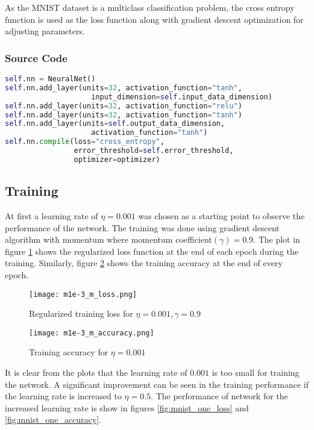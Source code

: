 \documentclass{article}
\begin{document}
As the MNIST dataset is a multiclass classification problem, the cross entropy function
is used as the loss function along with gradient descent optimization for adjusting
parameters.

\subsubsection{Source Code}
\begin{lstlisting}[language=python]
self.nn = NeuralNet()
self.nn.add_layer(units=32, activation_function="tanh",
                    input_dimension=self.input_data_dimension)
self.nn.add_layer(units=32, activation_function="relu")
self.nn.add_layer(units=32, activation_function="tanh")
self.nn.add_layer(units=self.output_data_dimension,
                    activation_function="tanh")
self.nn.compile(loss="cross_entropy",
                error_threshold=self.error_threshold,
                optimizer=optimizer)
\end{lstlisting}

\subsection{Training}
At first a learning rate of $\eta = 0.001$ was chosen as a starting point
to observe the performance of the network. The training was done using gradient
descent algorithm with momentum where momentum coefficient$(\gamma) = 0.9$.  The plot in figure \ref{fig:mnist_three_loss} shows
the regularized loss function at the end of each epoch during the training. Similarly, figure \ref{fig:mnist_three_accuracy} shows the
training accuracy at the end of every epoch.

\begin{figure}[!ht]
  \texttt{[image: m1e-3\_m\_loss.png]}
  \caption{Regularized training loss for $\eta = 0.001, \gamma = 0.9$}
  \label{fig:mnist_three_loss}
\end{figure}

\begin{figure}[!ht]
  \texttt{[image: m1e-3\_m\_accuracy.png]}
  \caption{Training accuracy for $\eta = 0.001$}
  \label{fig:mnist_three_accuracy}
\end{figure}

It is clear from the plots that the learning rate of $0.001$ is too small for training the network. A
significant improvement can be seen in the training performance if the learning rate is increased to $\eta = 0.5$.
The performance of network for the increased learning rate is show in figures \ref{fig:mnist_one_loss} and \ref{fig:mnist_one_accuracy}.
\end{document}
